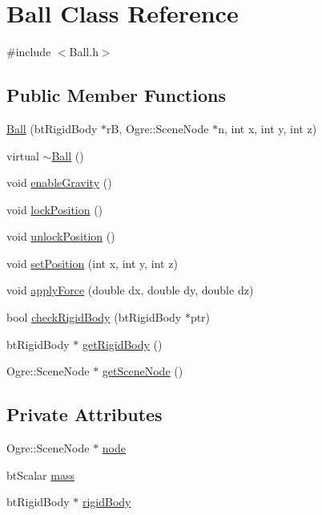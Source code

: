\hypertarget{classBall}{\section{Ball Class Reference}
\label{classBall}
}


{\ttfamily \#include $<$Ball.\-h$>$}

\subsection*{Public Member Functions}
\begin{DoxyCompactItemize}
\item 
\hyperlink{classBall_aec238435b8abb83b6459dc811be703b9}{Ball} (bt\-Rigid\-Body $\ast$r\-B, Ogre\-::\-Scene\-Node $\ast$n, int x, int y, int z)
\item 
virtual \hyperlink{classBall_a20f2f6ac0bf648f406a8e12e63429fcd}{$\sim$\-Ball} ()
\item 
void \hyperlink{classBall_acc744032fcdb54f6555880296b899a1e}{enable\-Gravity} ()
\item 
void \hyperlink{classBall_aca417b802b8bd765d6a06adc64b4cd1c}{lock\-Position} ()
\item 
void \hyperlink{classBall_ab4ad64bcaa75353124023b924de9ff98}{unlock\-Position} ()
\item 
void \hyperlink{classBall_afe626f0cd58bb4e6e604f18be11ae6ca}{set\-Position} (int x, int y, int z)
\item 
void \hyperlink{classBall_a8560c24afa515d3319cdf08dd918bf82}{apply\-Force} (double dx, double dy, double dz)
\item 
bool \hyperlink{classBall_a6364b72dcbf707a3ff649fdf731936d4}{check\-Rigid\-Body} (bt\-Rigid\-Body $\ast$ptr)
\item 
bt\-Rigid\-Body $\ast$ \hyperlink{classBall_a0dde8c947575a2f2edb671ef02326c50}{get\-Rigid\-Body} ()
\item 
Ogre\-::\-Scene\-Node $\ast$ \hyperlink{classBall_a80897cd66327c7b8664b5416021c9f12}{get\-Scene\-Node} ()
\end{DoxyCompactItemize}
\subsection*{Private Attributes}
\begin{DoxyCompactItemize}
\item 
Ogre\-::\-Scene\-Node $\ast$ \hyperlink{classBall_af1e78462805ffd11789b6e6d3940068f}{node}
\item 
bt\-Scalar \hyperlink{classBall_aee2035d202321b658c0869f1e885766b}{mass}
\item 
bt\-Rigid\-Body $\ast$ \hyperlink{classBall_aa692f8be903d336bb9908482c464ff4b}{rigid\-Body}
\end{DoxyCompactItemize}


